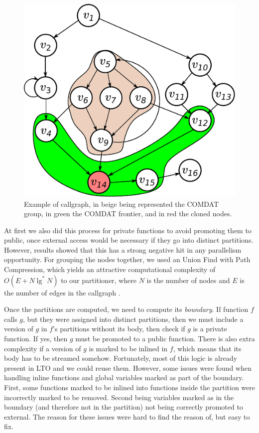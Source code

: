 \documentclass[runningheads]{llncs}
\begin{document}
\begin{figure}
\centering
	 \includegraphics[scale=0.7]{figuras/comdat_frontier.pdf}
	  \caption{Example of callgraph, in beige being represented the COMDAT group,
	  in green the COMDAT frontier, and in red the cloned nodes.}
	  \label{fig:comdat_frontier}
\end{figure}

At first we also did this process for private functions to avoid
promoting them to public, once external access would be necessary if they go
into distinct partitions. However, results showed that this has a strong
negative hit in any parallelism opportunity. For grouping the nodes together,
we used an Union Find with Path Compression, which yields an attractive
computational complexity of $O(E + N \lg^*N)$ to our partitioner, where $N$ is the
number of nodes and $E$ is the number of edges in the callgraph \cite{feufiloff}.

Once the partitions are computed, we need to compute its \textit{boundary}.
If function $f$ calls $g$, but they were assigned into distinct partitions,
then we must include a version of $g$ in $f$'s partitions without its body,
then check if $g$ is a private function. If yes, then $g$ must be promoted
to a public function. There is also extra complexity if a version of $g$
is marked to be inlined in $f$, which means that its body has to be
streamed somehow. Fortunately, most of this logic is already present
in LTO and we could reuse them. However, some issues were found
when handling inline functions and global variables marked as part
of the boundary. First, some functions marked to be inlined into 
functions inside the partition were incorrectly marked to be removed.
Second being variables marked as in the boundary (and therefore
not in the partition) not being correctly promoted to external. The reason
for these issues were hard to find the reason of, but easy to fix.
\end{document}
